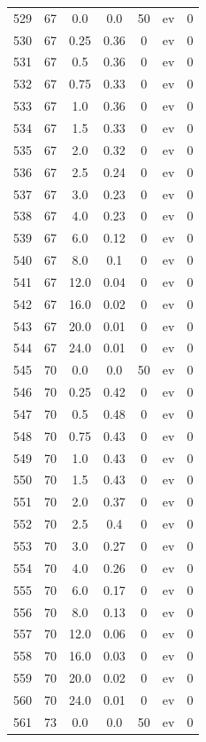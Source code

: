 \documentclass[12pt,a4paper]{article}
\begin{document}
\begin{tabular}{r|cccccc}
	529 & 67 & 0.0 & 0.0 & 50 & ev & 0 \\
	530 & 67 & 0.25 & 0.36 & 0 & ev & 0 \\
	531 & 67 & 0.5 & 0.36 & 0 & ev & 0 \\
	532 & 67 & 0.75 & 0.33 & 0 & ev & 0 \\
	533 & 67 & 1.0 & 0.36 & 0 & ev & 0 \\
	534 & 67 & 1.5 & 0.33 & 0 & ev & 0 \\
	535 & 67 & 2.0 & 0.32 & 0 & ev & 0 \\
	536 & 67 & 2.5 & 0.24 & 0 & ev & 0 \\
	537 & 67 & 3.0 & 0.23 & 0 & ev & 0 \\
	538 & 67 & 4.0 & 0.23 & 0 & ev & 0 \\
	539 & 67 & 6.0 & 0.12 & 0 & ev & 0 \\
	540 & 67 & 8.0 & 0.1 & 0 & ev & 0 \\
	541 & 67 & 12.0 & 0.04 & 0 & ev & 0 \\
	542 & 67 & 16.0 & 0.02 & 0 & ev & 0 \\
	543 & 67 & 20.0 & 0.01 & 0 & ev & 0 \\
	544 & 67 & 24.0 & 0.01 & 0 & ev & 0 \\
	545 & 70 & 0.0 & 0.0 & 50 & ev & 0 \\
	546 & 70 & 0.25 & 0.42 & 0 & ev & 0 \\
	547 & 70 & 0.5 & 0.48 & 0 & ev & 0 \\
	548 & 70 & 0.75 & 0.43 & 0 & ev & 0 \\
	549 & 70 & 1.0 & 0.43 & 0 & ev & 0 \\
	550 & 70 & 1.5 & 0.43 & 0 & ev & 0 \\
	551 & 70 & 2.0 & 0.37 & 0 & ev & 0 \\
	552 & 70 & 2.5 & 0.4 & 0 & ev & 0 \\
	553 & 70 & 3.0 & 0.27 & 0 & ev & 0 \\
	554 & 70 & 4.0 & 0.26 & 0 & ev & 0 \\
	555 & 70 & 6.0 & 0.17 & 0 & ev & 0 \\
	556 & 70 & 8.0 & 0.13 & 0 & ev & 0 \\
	557 & 70 & 12.0 & 0.06 & 0 & ev & 0 \\
	558 & 70 & 16.0 & 0.03 & 0 & ev & 0 \\
	559 & 70 & 20.0 & 0.02 & 0 & ev & 0 \\
	560 & 70 & 24.0 & 0.01 & 0 & ev & 0 \\
	561 & 73 & 0.0 & 0.0 & 50 & ev & 0 \\

\end{tabular}
\end{document}

